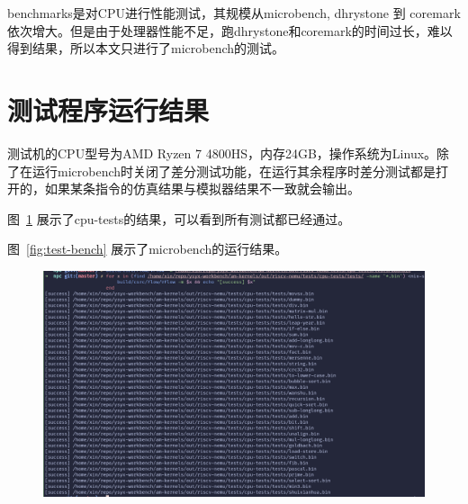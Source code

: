 benchmarks是对CPU进行性能测试，其规模从microbench, dhrystone 到 coremark依次增大。但是由于处理器性能不足，跑dhrystone和coremark的时间过长，难以得到结果，所以本文只进行了microbench的测试。

\section{测试程序运行结果}

测试机的CPU型号为AMD Ryzen 7 4800HS，内存24GB，操作系统为Linux。除了在运行microbench时关闭了差分测试功能，在运行其余程序时差分测试都是打开的，如果某条指令的仿真结果与模拟器结果不一致就会输出。

图~\ref{fig:test-cpu} 展示了cpu-tests的结果，可以看到所有测试都已经通过。

图~\ref{fig:test-bench} 展示了microbench的运行结果。

\begin{figure}
    \centering
    \includegraphics[width=\textwidth]{resources/test-cpu.png}
    \label{fig:test-cpu}
\end{figure}

